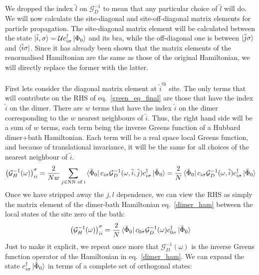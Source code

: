 \documentclass{report}
\numberwithin{equation}{section}
\begin{document}
We dropped the index \(\tilde l\) on \(\mathcal{G}_D^{-1}\) to mean that any particular choice of \(\tilde l\) will do. We will now calculate the site-diagonal and site-off-diagonal matrix elements for particle propagation. The site-diagonal matrix element will be calculated between the state $\ket{\tilde i, \sigma} = \mathcal{U}c^\dagger_{i\sigma}\ket{\Phi_0}$ and its bra, while the off-diagonal one is between $\ket{\tilde j\sigma}$ and $\bra{\tilde i\sigma}$. Since it has already been shown that the matrix elements of the renormalised Hamiltonian are the same as those of the original Hamiltonian, we will directly replace the former with the latter. \\\\
First lets consider the diagonal matrix element at $\tilde i^\text{th}$ site. The only terms that will contribute on the RHS of eq.~\ref{green_eq_final} are those that have the index $\tilde i$ on the dimer. There are $w$ terms that have the index \(\tilde i\) on the dimer corresponding to the $w$ nearest neighbours of \(\tilde i\). Thus, the right hand side will be a sum of $w$ terms, each term being the inverse Greens function of a Hubbard dimer+bath Hamiltonian. Each term will be a real space local Greens function, and because of translational invariance, it will be the same for all choices of the nearest neighbour of \(\tilde i\).
\begin{gather}
	\left(\mathcal{G}_{H}^{-1}(\omega)\right)_{ii}^\sigma = \frac{2}{Nw}\sum_{j \in \text{NN of i}}\bra{\tilde \Phi_0}c_{i\sigma}\mathcal{G}_{D}^{-1}(\omega, \tilde i, \tilde j)c^\dagger_{i\sigma}\ket{\tilde \Phi_0} = \frac{2}{N}\bra{\tilde \Phi_0}c_{i\sigma}\mathcal{G}_{D}^{-1}(\omega, \tilde i)c^\dagger_{i\sigma}\ket{\tilde \Phi_0}
\end{gather}
Once we have stripped away the \(j,l\) dependence, we can view the RHS as simply the matrix element of the dimer-bath Hamiltonian eq.~\ref{dimer_ham} between the local states of the site zero of the bath:
\begin{gather}
	\label{local_gf}
	\left(\mathcal{G}_{H}^{-1}(\omega)\right)_{ii}^\sigma = \frac{2}{N}\bra{\tilde \Phi_0}c_{0\sigma}\mathcal{G}_{D}^{-1}(\omega)c^\dagger_{0\sigma}\ket{\tilde \Phi_0}
\end{gather}
Just to make it explicit, we repeat once more that \(\mathcal{G}_{D}^{-1}(\omega)\) is the inverse Greens function operator of the Hamiltonian in eq.~\ref{dimer_ham}.
We can expand the state $c^\dagger_{i\sigma}\ket{\tilde \Phi_0}$ in terms of a complete set of orthogonal states:
\end{document}
